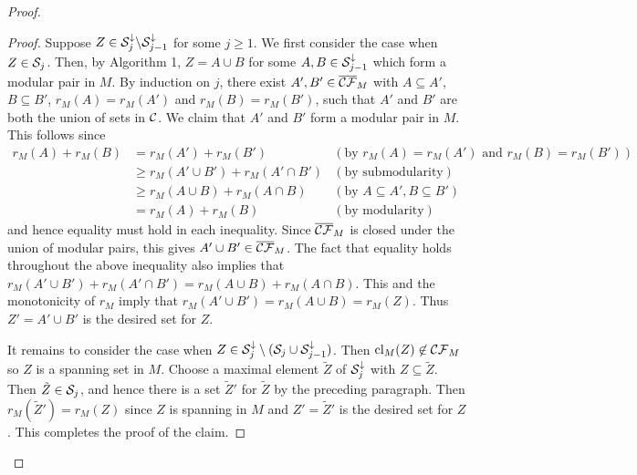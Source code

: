 \documentclass{daj}
\newcommand{\sm}{{\setminus}}
\begin{document}
\begin{proof}
\begin{proof}
Suppose $Z\in {\cal S}_j^{\downarrow}\sm {\cal S}_{j-1}^{\downarrow}$ for some $j\geq 1$. 
We first consider the case when $Z\in {\cal S}_j$.
Then, by Algorithm 1, $Z=A\cup B$ for some $A, B\in {\cal S}_{j-1}^{\downarrow}$ which form a modular pair in $M$.
By induction on $j$, there exist $A', B'\in \overline{\cal CF}_M$ with $A\subseteq A'$, $B\subseteq B'$,
$r_{M}(A)=r_{M}(A')$ and
$r_{M}(B)=r_{M}(B')$, such that $A'$ and $B'$ are both the union of sets in  ${\cal C}$.
We claim that $A'$ and $B'$ form a modular pair in $M$. This follows since
\begin{align*}
r_{M}(A)+r_{M}(B)&=r_{M}(A')+r_{M}(B') & (\text{by $r_M(A)=r_M(A')$ and $r_M(B)=r_M(B')$})\\
&\geq r_{M}(A'\cup B')+r_{M}(A'\cap B') & (\text{by submodularity}) \\
&\geq r_{M}(A\cup B)+r_{M}(A\cap B)  & (\text{by $A\subseteq A', B\subseteq B'$})\\
&=r_{M}(A)+r_{M}(B) & (\text{by modularity})
\end{align*}
%
and hence equality must hold in each inequality.
Since $\overline{\cal CF}_M$ is closed under the union of modular pairs, this gives $A'\cup B'\in \overline{\cal CF}_M$.
The fact that equality holds throughout the above inequality also implies that $r_{M}(A'\cup B')+r_{M}(A'\cap B')= r_{M}(A\cup B)+r_{M}(A\cap B)$.
This and the monotonicity of $r_{M}$ imply that $r_{M}(A'\cup B')=r_{M}(A\cup B)=r_{M}(Z)$.
Thus $Z'=A'\cup B'$ is the desired set for $Z$.

It remains to consider the case when $Z\in {\cal S}_j^{\downarrow}\setminus ({\cal S}_j\cup {\cal S}_{j-1}^{\downarrow})$. Then ${\rm cl}_M(Z)\not\in {\cal CF}_M$ so 
$Z$ is a spanning set in $M$. 
Choose a maximal element $\tilde Z$ of ${\cal S}_j^{\downarrow}$ with $Z\subseteq \tilde Z$.
Then  $\tilde Z\in {\cal S}_j$, and hence there is a set $\tilde Z'$ for $\tilde Z$ by the preceding paragraph.
Then $r_M(\tilde Z')=r_M(Z)$ since $Z$ is spanning in $M$ and $Z'=\tilde Z'$ is the desired set for $Z$.
This completes the proof of the claim.
\end{proof}


\end{proof}
\end{document}
